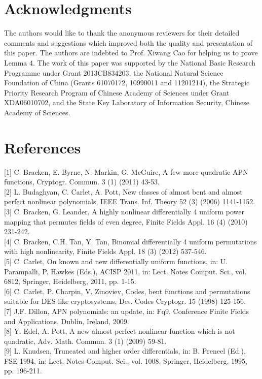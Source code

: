 \documentclass[10pt]{article}
\begin{document}
\section*{Acknowledgments}
The authors would like to thank the anonymous reviewers for their detailed comments and suggestions which improved both the quality and presentation of this paper. The authors are indebted to Prof. Xiwang Cao for helping us to prove Lemma 4. The work of this paper was supported by the National Basic Research Programme under Grant 2013CB834203, the National Natural Science Foundation of China (Grants 61070172, 10990011 and 11201214), the Strategic Priority Research Program of Chinese Academy of Sciences under Grant XDA06010702, and the State Key Laboratory of Information Security, Chinese Academy of Sciences.

\section*{References}
[1] C. Bracken, E. Byrne, N. Markin, G. McGuire, A few more quadratic APN functions, Cryptogr. Commun. 3 (1) (2011) 43-53.\\[0pt]
[2] L. Budaghyan, C. Carlet, A. Pott, New classes of almost bent and almost perfect nonlinear polynomials, IEEE Trans. Inf. Theory 52 (3) (2006) 1141-1152.\\[0pt]
[3] C. Bracken, G. Leander, A highly nonlinear differentially 4 uniform power mapping that permutes fields of even degree, Finite Fields Appl. 16 (4) (2010) 231-242.\\[0pt]
[4] C. Bracken, C.H. Tan, Y. Tan, Binomial differentially 4 uniform permutations with high nonlinearity, Finite Fields Appl. 18 (3) (2012) 537-546.\\[0pt]
[5] C. Carlet, On known and new differentially uniform functions, in: U. Parampalli, P. Hawkes (Eds.), ACISP 2011, in: Lect. Notes Comput. Sci., vol. 6812, Springer, Heidelberg, 2011, pp. 1-15.\\[0pt]
[6] C. Carlet, P. Charpin, V. Zinoviev, Codes, bent functions and permutations suitable for DES-like cryptosystems, Des. Codes Cryptogr. 15 (1998) 125-156.\\[0pt]
[7] J.F. Dillon, APN polynomials: an update, in: Fq9, Conference Finite Fields and Applications, Dublin, Ireland, 2009.\\[0pt]
[8] Y. Edel, A. Pott, A new almost perfect nonlinear function which is not quadratic, Adv. Math. Commun. 3 (1) (2009) 59-81.\\[0pt]
[9] L. Knudsen, Truncated and higher order differentials, in: B. Preneel (Ed.), FSE 1994, in: Lect. Notes Comput. Sci., vol. 1008, Springer, Heidelberg, 1995, pp. 196-211.\\[0pt]
\end{document}

